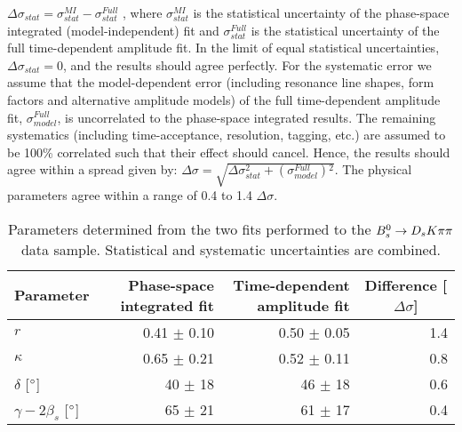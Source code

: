 $\Delta \sigma_{stat} = \sigma^{MI}_{stat} - \sigma^{Full}_{stat}$ ,
where $\sigma^{MI}_{stat}$ is the statistical uncertainty of the phase-space integrated (model-independent) fit 
and $\sigma^{Full}_{stat}$ is the statistical uncertainty of the full time-dependent amplitude fit.
In the limit of equal statistical uncertainties, $\Delta \sigma_{stat} = 0$,  and the results should agree perfectly.
For the systematic error we assume that the model-dependent error (including resonance line shapes, form factors and alternative amplitude models) of the full time-dependent amplitude fit, 
$\sigma^{Full}_{model}$, is uncorrelated 
to the phase-space integrated results.
The remaining systematics (including time-acceptance, resolution, tagging, etc.) are assumed to be 100\% correlated such that their effect should cancel.
Hence, the results should agree within a spread given by:
$\Delta \sigma = \sqrt{ \Delta \sigma_{stat}^2 + (\sigma^{Full}_{model}){}^2}$.
The physical parameters agree within a range of 0.4 to 1.4 $\Delta \sigma$. 


\begin{table}[h]
\centering
\caption{Parameters determined from the two fits performed to the ${{B}^0_{s}}\rightarrow{\ensuremath{{D}_{s}}}{\ensuremath{K}}{\ensuremath{\pi}}{\ensuremath{\pi}}$ data sample. 
 Statistical and systematic uncertainties are combined.}
\begin{tabular}{l r r r }
\hline
\hline
Parameter & Phase-space integrated fit & Time-dependent amplitude fit &\multicolumn{1}{c}{ Difference [$\Delta\sigma$]} \\
\hline
$r$ & 0.41 $\pm$ 0.10  & 0.50 $\pm$ 0.05 & 1.4 \\
$\kappa$ & 0.65 $\pm$ 0.21  & 0.52 $\pm$ 0.11 & 0.8\\
$\delta$ [$^{\circ}$] & 40 $\pm$ 18 & 46 $\pm$ 18 & 0.6\\
$\gamma - 2 \beta_s$ [$^{\circ}$] & 65 $\pm$ 21  & 61 $\pm$ 17 & 0.4\\
\hline
\hline
\end{tabular}
\label{tab:ResultSummary}
\end{table}

